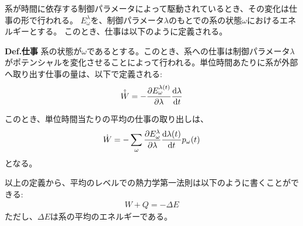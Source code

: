 \documentclass[a4paper,11pt]{jsarticle}
\numberwithin{equation}{section}
\begin{document}
系が時間に依存する制御パラメータによって駆動されているとき、その変化は仕事の形で行われる。
$E_{\omega}^{\lambda}$を、制御パラメータ$\lambda$のもとでの系の状態$\omega$におけるエネルギーとする。
このとき、仕事は以下のように定義される。
  \begin{itembox}[l]{\textbf{Def.仕事}}
    系の状態が$\omega$であるとする。このとき、系への仕事は制御パラメータ$\lambda$がポテンシャルを変化させることによって行われる。単位時間あたりに系が外部へ取り出す仕事の量は、以下で定義される:
    \begin{align}
      \hat{\dot{W}} = -\pdv{E^{\lambda(t)}_{\omega}}{\lambda}\dv{\lambda}{t}
    \end{align}
  \end{itembox}
このとき、単位時間当たりの平均の仕事の取り出しは、
    \begin{align}
        \dot{W} = -\sum_{\omega} \pdv{E^{\lambda}_{\omega}}{\lambda}\dv{\lambda(t)}{t} p_{\omega}(t)
    \end{align}
    となる。

  以上の定義から、平均のレベルでの熱力学第一法則は以下のように書くことができる:
  \begin{align}
    W + Q = -\Delta E
  \end{align}
  ただし、$\Delta E$は系の平均のエネルギーである。\\
\end{document}
